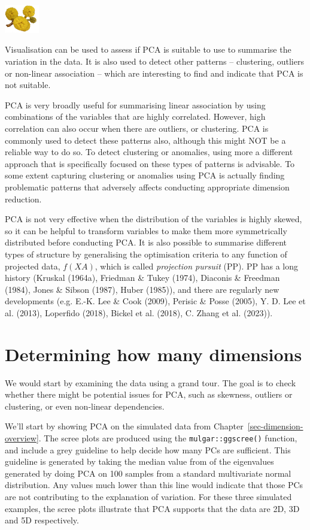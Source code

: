\documentclass[
  letterpaper,
]{krantz}
\newcommand{\infobox}[1]{%
\noindent\colorbox{info!30}{%
\begin{minipage}{0.98\linewidth}%
    \centering%
    \begin{minipage}[c]{0.15\linewidth} %
      \includegraphics[width=1.5cm]{images/mulga-flowers2.png} %
    \end{minipage}%
    \hfill %
    \begin{minipage}[c]{0.8\linewidth} %
      \bigskip%
      \textsf{#1}%
      \bigskip%
    \end{minipage}%
    \hspace*{3mm}%
  \end{minipage}%
}%
}
\begin{document}
\infobox{Visualisation can be used to assess if PCA is suitable to use to summarise the variation in the data. It is also used to detect other patterns -- clustering, outliers or non-linear association -- which are interesting to find and indicate that PCA is not suitable.}

PCA is very broadly useful for summarising linear association by using
combinations of the variables that are highly correlated. However, high
correlation can also occur when there are outliers, or clustering. PCA
is commonly used to detect these patterns also, although this might NOT
be a reliable way to do so. To detect clustering or anomalies, using
more a different approach that is specifically focused on these types of
patterns is advisable. To some extent capturing clustering or anomalies
using PCA is actually finding problematic patterns that adversely
affects conducting appropriate dimension reduction.

PCA is not very effective when the distribution of the variables is
highly skewed, so it can be helpful to transform variables to make them
more symmetrically distributed before conducting PCA. It is also
possible to summarise different types of structure by generalising the
optimisation criteria to any function of projected data, \(f(XA)\),
which is called \emph{projection pursuit} (PP). PP has a long history
(Kruskal (1964a), Friedman \& Tukey (1974), Diaconis \& Freedman (1984),
Jones \& Sibson (1987), Huber (1985)), and there are regularly new
developments (e.g. E.-K. Lee \& Cook (2009), Perisic \& Posse (2005), Y.
D. Lee et al. (2013), Loperfido (2018), Bickel et al. (2018), C. Zhang
et al. (2023)).

\section{Determining how many
dimensions}\label{determining-how-many-dimensions}

We would start by examining the data using a grand tour. The goal is to
check whether there might be potential issues for PCA, such as skewness,
outliers or clustering, or even non-linear dependencies.

We'll start by showing PCA on the simulated data from
Chapter~\ref{sec-dimension-overview}. The scree plots are produced using
the \texttt{mulgar::ggscree()} function, and include a grey guideline to
help decide how many PCs are sufficient. This guideline is generated by
taking the median value from of the eigenvalues generated by doing PCA
on 100 samples from a standard multivariate normal distribution. Any
values much lower than this line would indicate that those PCs are not
contributing to the explanation of variation. For these three simulated
examples, the scree plots illustrate that PCA supports that the data are
2D, 3D and 5D respectively.
\end{document}
